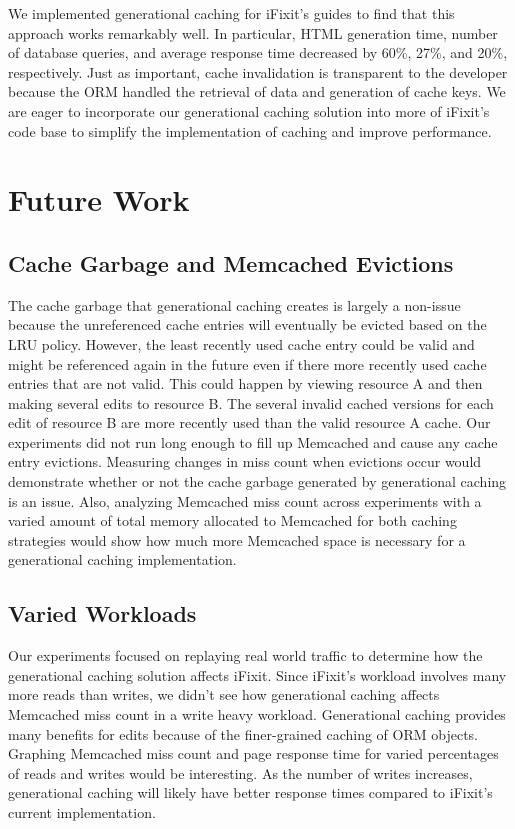 \documentclass[12pt]{ucthesis}
\begin{document}
We implemented generational caching for \textsf{iFixit}'s guides to find that this approach works remarkably well.
In particular, HTML generation time, number of database queries, and average response time decreased by 60\%, 27\%, and 20\%, respectively.
Just as important, cache invalidation is transparent to the developer because the ORM handled the retrieval of data and generation of cache keys.
We are eager to incorporate our generational caching solution into more of \textsf{iFixit}'s code base to simplify the implementation of caching and improve performance.

\section{Future Work}
\subsection{Cache Garbage and Memcached Evictions}
The cache garbage that generational caching creates is largely a non-issue because the unreferenced cache entries will eventually be evicted based on the LRU policy.
However, the least recently used cache entry could be valid and might be referenced again in the future even if there more recently used cache entries that are not valid.
This could happen by viewing resource A and then making several edits to resource B.
The several invalid cached versions for each edit of resource B are more recently used than the valid resource A cache.
Our experiments did not run long enough to fill up \textsf{Memcached} and cause any cache entry evictions.
Measuring changes in miss count when evictions occur would demonstrate whether or not the cache garbage generated by generational caching is an issue.
Also, analyzing \textsf{Memcached} miss count across experiments with a varied amount of total memory allocated to \textsf{Memcached} for both caching strategies would show how much more \textsf{Memcached} space is necessary for a generational caching implementation.

\subsection{Varied Workloads}
Our experiments focused on replaying real world traffic to determine how the generational caching solution affects \textsf{iFixit}.
Since \textsf{iFixit}'s workload involves many more reads than writes, we didn't see how generational caching affects \textsf{Memcached} miss count in a write heavy workload.
Generational caching provides many benefits for edits because of the finer-grained caching of ORM objects.
Graphing \textsf{Memcached} miss count and page response time for varied percentages of reads and writes would be interesting.
As the number of writes increases, generational caching will likely have better response times compared to \textsf{iFixit}'s current implementation.



\clearpage


\end{document}
